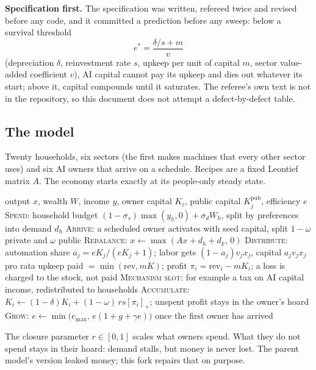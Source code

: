 \documentclass[11pt]{article}
\newcommand{\code}[1]{\texttt{#1}}
\begin{document}
\textbf{Specification first.} The specification was written, refereed twice and revised
before any code, and it committed a prediction before any sweep: below a survival
threshold
\[
e^* = \frac{\delta/s + m}{v}
\]
(depreciation $\delta$, reinvestment rate $s$, upkeep per unit of capital $m$, sector
value-added coefficient $v$), AI capital cannot pay its upkeep and dies out whatever its
start; above it, capital compounds until it saturates. The referee's own text is not in
the repository, so this document does not attempt a defect-by-defect table.

\subsection{The model}

Twenty households, six sectors (the first makes machines that every other sector uses)
and six AI owners that arrive on a schedule. Recipes are a fixed Leontief matrix $A$.
The economy starts exactly at its people-only steady state.

\begin{algorithm}[H]
\caption{One tick of \code{capital\_economy}}
\begin{algorithmic}[1]
\Require output $x$, wealth $W$, income $y$, owner capital $K_i$, public capital $K^{\text{pub}}_j$, efficiency $e$
\State \textsc{Spend:} household budget $(1-\sigma_s)\max(y_h,0) + \sigma_d W_h$, split by preferences into demand $d_h$
\State \textsc{Arrive:} a scheduled owner activates with seed capital, split $1-\omega$ private and $\omega$ public
\State \textsc{Rebalance:} $x \gets \max(Ax + d_h + d_k,\, 0)$ 
\State \textsc{Distribute:} automation share $a_j = eK_j/(eK_j+1)$; labor gets $(1-a_j)v_jx_j$, capital $a_jv_jx_j$ pro rata
\State \hspace{1.6em} upkeep paid $=\min(\text{rev}, mK)$; profit $\pi_i = \text{rev}_i - mK_i$; a loss is charged to the stock, not paid
\State \textsc{Mechanism slot:} for example a tax on AI capital income, redistributed to households
\State \textsc{Accumulate:} $K_i \gets (1-\delta)K_i + (1-\omega)\, r s [\pi_i]_+$; unspent profit stays in the owner's hoard
\State \textsc{Grow:} $e \gets \min\big(e_{\max},\, e(1+g+\gamma e)\big)$ once the first owner has arrived
\end{algorithmic}
\end{algorithm}

\noindent The closure parameter $r\in[0,1]$ scales what owners spend. What they do not
spend stays in their hoard: demand stalls, but money is never lost. The parent model's
version leaked money; this fork repairs that on purpose.
\end{document}
